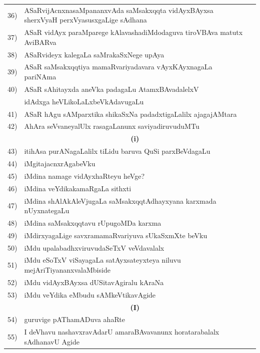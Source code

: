 {\begin{longtable}{@{}cp{7.4cm}r}
36) & ASaRvijAcnxnasaMpananxvAda saMsakxqqta vidAyxBAyxsa sherxVyaH perxVyasusxgaLige sAdhana & \pageref{page42b}\\
37) & ASaR vidAyx paraMparege kAlavashadiMdodaguva tiroVBAva matutx AviBARva & \pageref{page92}\\
38) & ASaRvideyx kalegaLa saMrakaSxNege upAya & \pageref{page50a} \\
39) & ASaR saMsakxqqtiya mamaRvariyadavara vAyxKAyxnagaLa pariNAma & \pageref{page24}\\
40) & ASaR sAhitayxda aneVka padagaLu AtamxBAvadalelxV & \\
    & idAdxga heVLikoLaLxbeVkAdavugaLu   & \pageref{page246}\\
41) & ASaR hAgu sAMparxtika shikaSxNa padadxtigaLalilx ajagajAMtara  & \pageref{page28}\\
42) & AhAra seVvaneyalUlx rasagaLanunx saviyadiruvuduMTu & \pageref{page221}\\[0.3cm]
    & \multicolumn{1}{c}{\textbf{(i)}} & \\[0.3cm]
43) & itihAsa purANagaLalilx tiLidu baruva QuSi parxBeVdagaLu &  \pageref{page62}\\
44) & iMgitajacnxrAgabeVku  & \pageref{page122}\\
45) & iMdina namage vidAyxhaRteyu heVge? & \pageref{page109}\\
46) & iMdina veYdikakamaRgaLa sithxti & \pageref{page208}\\
47) & iMdina shAlAkAleVjugaLa saMsakxqqtAdhayxyana karxmada nUyxnategaLu & \pageref{page43}\\
48) & iMdina saMsakxqqtavu rUpugoMDa karxma & \pageref{page12}\\
49) & iMdirxyagaLige savxramamaRvariyuva sUkaSxmXte beVku & \pageref{page125}\\
50) & iMdu upalabadhxviruvudaSeTxV veVdavalalx & \pageref{page134}\\
51) & iMdu eSoTxV viSayagaLa satAyxsateyxteya niluvu mejAriTi\-yananxvalaMbiside & \pageref{page215}\\
52) & iMdu vidAyxBAyxsa dUSitavAgiralu kAraNa & \pageref{page41e}\\
53) & iMdu veYdika eMbudu sAMkeVtikavAgide & \pageref{page206}\\ [0.3cm]  
    & \multicolumn{1}{c}{\textbf{(I)}} & \\[0.3cm]
54) & guruvige pAThamADuva ahaRte &  \pageref{page105}\\
55) & I deVhavu nashavxravAdarU amaraBAvavanunx horatarabalalx sAdhanavU Agide &\pageref{page129}\\

\end{longtable}}
